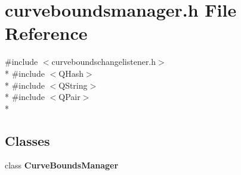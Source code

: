 \section{curveboundsmanager.\+h File Reference}
\label{curveboundsmanager_8h}
{\ttfamily \#include $<$curveboundschangelistener.\+h$>$}\\*
{\ttfamily \#include $<$Q\+Hash$>$}\\*
{\ttfamily \#include $<$Q\+String$>$}\\*
{\ttfamily \#include $<$Q\+Pair$>$}\\*
\subsection*{Classes}
\begin{DoxyCompactItemize}
\item 
class {\bf Curve\+Bounds\+Manager}
\end{DoxyCompactItemize}
